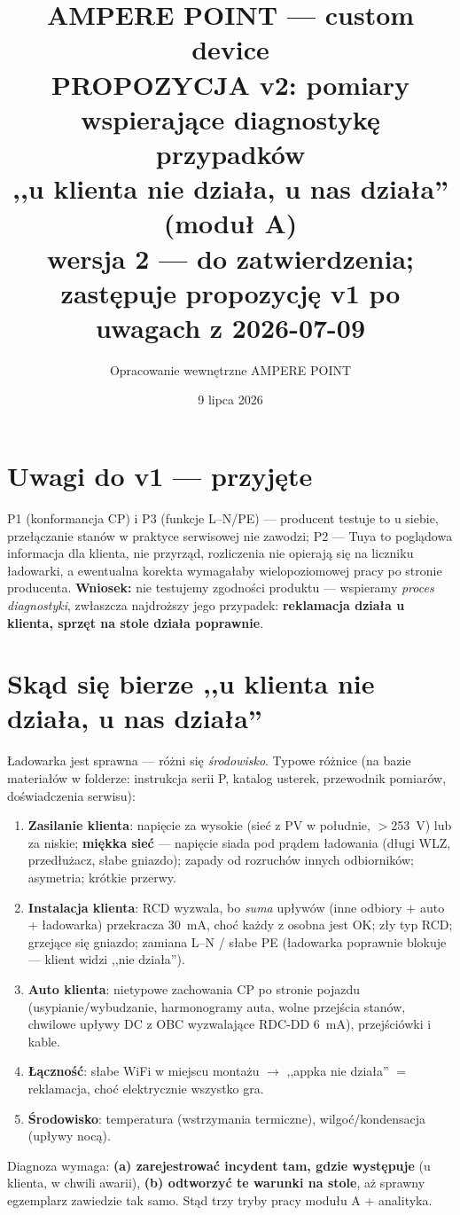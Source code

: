 \documentclass[11pt,a4paper]{article}
\title{\textbf{AMPERE POINT --- custom device}\\[4pt]
\large PROPOZYCJA v2: pomiary wspierające diagnostykę przypadków\\
,,u klienta nie działa, u nas działa'' (moduł A)\\[2pt]
\normalsize wersja 2 --- do zatwierdzenia; zastępuje propozycję v1 po uwagach z 2026-07-09}
\author{Opracowanie wewnętrzne AMPERE POINT}
\date{9 lipca 2026}
\begin{document}
\maketitle
\vspace{-1.4em}

\section{Uwagi do v1 --- przyjęte}
P1 (konformancja CP) i P3 (funkcje L--N/PE) --- producent testuje to u siebie, przełączanie stanów
w praktyce serwisowej nie zawodzi; P2 --- Tuya to poglądowa informacja dla klienta, nie przyrząd,
rozliczenia nie opierają się na liczniku ładowarki, a ewentualna korekta wymagałaby wielopoziomowej
pracy po stronie producenta. \textbf{Wniosek:} nie testujemy zgodności produktu --- wspieramy
\emph{proces diagnostyki}, zwłaszcza najdroższy jego przypadek: \textbf{reklamacja działa u klienta,
sprzęt na stole działa poprawnie}.

\section{Skąd się bierze ,,u klienta nie działa, u nas działa''}
Ładowarka jest sprawna --- różni się \emph{środowisko}. Typowe różnice (na bazie materiałów
w folderze: instrukcja serii P, katalog usterek, przewodnik pomiarów, doświadczenia serwisu):
\begin{enumerate}
\item \textbf{Zasilanie klienta}: napięcie za wysokie (sieć z PV w południe, $>$253~V) lub za
niskie; \textbf{miękka sieć} --- napięcie siada pod prądem ładowania (długi WLZ, przedłużacz,
słabe gniazdo); zapady od rozruchów innych odbiorników; asymetria; krótkie przerwy.
\item \textbf{Instalacja klienta}: RCD wyzwala, bo \emph{suma} upływów (inne odbiory $+$ auto $+$
ładowarka) przekracza 30~mA, choć każdy z osobna jest OK; zły typ RCD; grzejące się gniazdo;
zamiana L--N / słabe PE (ładowarka poprawnie blokuje --- klient widzi ,,nie działa'').
\item \textbf{Auto klienta}: nietypowe zachowania CP po stronie pojazdu (usypianie/wybudzanie,
harmonogramy auta, wolne przejścia stanów, chwilowe upływy DC z OBC wyzwalające RDC-DD 6~mA),
przejściówki i kable.
\item \textbf{Łączność}: słabe WiFi w miejscu montażu $\to$ ,,appka nie działa'' $=$ reklamacja,
choć elektrycznie wszystko gra.
\item \textbf{Środowisko}: temperatura (wstrzymania termiczne), wilgoć/kondensacja (upływy nocą).
\end{enumerate}
Diagnoza wymaga: \textbf{(a) zarejestrować incydent tam, gdzie występuje} (u klienta, w chwili
awarii), \textbf{(b) odtworzyć te warunki na stole}, aż sprawny egzemplarz zawiedzie tak samo.
Stąd trzy tryby pracy modułu A + analityka.
\end{document}
